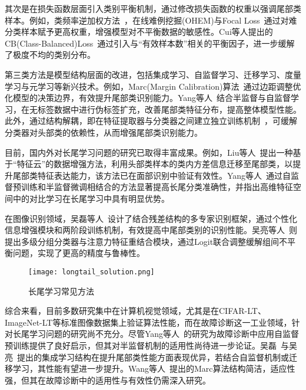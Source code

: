 \documentclass[master]{thesis-uestc}
\begin{document}
其次是在损失函数层面引入类别平衡机制，通过修改损失函数的权重以强调尾部类样本。例如，类频率逆加权方法~，在线难例挖掘(OHEM)与Focal Loss~通过对难分类样本赋予更高权重，增强模型对不平衡数据的敏感性。Cui等人提出的CB(Class-Balanced)Loss~通过引入与“有效样本数”相关的平衡因子，进一步缓解了极度不均的类别分布。

第三类方法是模型结构层面的改进，包括集成学习、自监督学习、迁移学习、度量学习与元学习等新兴技术。例如，Marc(Margin Calibration)算法~通过边距调整优化模型的决策边界，有效提升尾部类识别能力。Yang等人~结合半监督与自监督学习，在无标签数据中进行伪标签扩充，改善尾部类特征分布，提高整体模型性能。此外，通过结构解耦，即在特征提取器与分类器之间建立独立训练机制~，可缓解分类器对头部类的依赖性，从而增强尾部类识别能力。

目前，国内外对长尾学习问题的研究已取得丰富成果。例如，Liu等人~提出一种基于“特征云”的数据增强方法，利用头部类样本的类内方差信息迁移至尾部类，以提升尾部类特征表达能力，该方法已在面部识别中验证有效性。Yang等人~通过自监督预训练和半监督微调相结合的方法显著提高长尾分类准确性，并指出高维特征空间中的对比学习在长尾学习中具有明显优势。

在图像识别领域，吴磊等人~设计了结合残差结构的多专家识别框架，通过个性化信息增强模块和两阶段训练机制，有效提高中尾部类别的识别性能。吴亮等人~则提出多级分组分类器与注意力特征重结合模块，通过Logit联合调整缓解组间不平衡问题，实现了更高的精度与鲁棒性。

\begin{figure}[h]
    \centering
    \texttt{[image: longtail\_solution.png]}
    \caption{长尾学习常见方法}
    \label{longtail_solution}
\end{figure}

综合来看，目前多数研究集中在计算机视觉领域，尤其是在CIFAR-LT、ImageNet-LT等标准图像数据集上验证算法性能，而在故障诊断这一工业领域，针对长尾学习问题的研究尚不充分。尽管Yang等人~的研究为故障诊断中应用自监督预训练提供了良好启示，但其对半监督机制的适用性尚待进一步论证。吴磊~与吴亮~提出的集成学习结构在提升尾部类性能方面表现优异，若结合自监督机制或迁移学习，其性能有望进一步提升。Wang等人~提出的Marc算法结构简洁，适应性强，但其在故障诊断中的适用性与有效性仍需深入研究。
\end{document}
